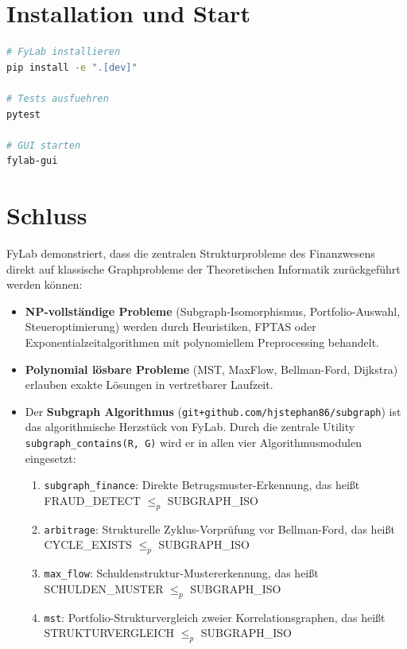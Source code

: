\documentclass[a4paper,12pt]{article}
\begin{document}
\section{Installation und Start}
\label{sec:install}

\begin{lstlisting}[language=bash, caption=Installation und Start]
# FyLab installieren
pip install -e ".[dev]"

# Tests ausfuehren
pytest

# GUI starten
fylab-gui
\end{lstlisting}

\section{Schluss}
\label{sec:schluss}

FyLab demonstriert, dass die zentralen Strukturprobleme des Finanzwesens
direkt auf klassische Graphprobleme der Theoretischen Informatik
zurückgeführt werden können:

\begin{itemize}
    \item \textbf{NP-vollständige Probleme} (Subgraph-Isomorphismus,
    Portfolio-Auswahl, Steueroptimierung) werden durch Heuristiken,
    FPTAS oder Exponentialzeitalgorithmen mit polynomiellem Preprocessing
    behandelt.
    \item \textbf{Polynomial lösbare Probleme} (MST, MaxFlow, Bellman-Ford,
    Dijkstra) erlauben exakte Lösungen in vertretbarer Laufzeit.
    \item Der \textbf{Subgraph Algorithmus} (\texttt{git+github.com/hjstephan86/subgraph})
    ist das algorithmische Herzstück von FyLab. Durch die zentrale Utility
    \texttt{subgraph\_contains\newline (R, G)} wird er in allen vier Algorithmusmodulen
    eingesetzt:
    \begin{enumerate}
        \item \texttt{subgraph\_finance}: Direkte Betrugsmuster-Erkennung, das heißt FRAUD\_\newline DETECT $\leq_p$ SUBGRAPH\_ISO
        \item \texttt{arbitrage}: Strukturelle Zyklus-Vorprüfung vor Bellman-Ford, das heißt CYCLE\_EXISTS $\leq_p$ SUBGRAPH\_ISO
        \item \texttt{max\_flow}: Schuldenstruktur-Mustererkennung, das heißt SCHULDEN\_\newline MUSTER $\leq_p$ SUBGRAPH\_ISO
        \item \texttt{mst}: Portfolio-Strukturvergleich zweier Korrelationsgraphen, das heißt STRUKTURVERGLEICH $\leq_p$ SUBGRAPH\_ISO
    \end{enumerate}
\end{itemize}
\end{document}
